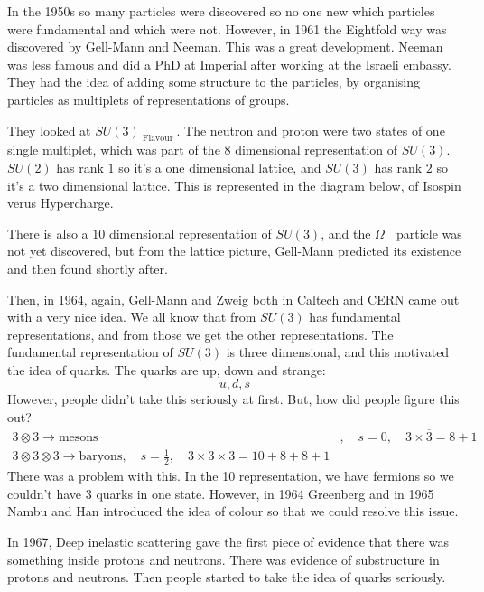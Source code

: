 \documentclass[11pt, oneside]{article}   	%
\theoremstyle{slanted}
\begin{document}
In the 1950s 
so many particles were discovered so no one 
new which particles were fundamental and which 
were not. 
However, in 1961 the Eightfold way 
was discovered by Gell-Mann and Neeman.  
This was a great development. 
Neeman was less famous and did a PhD at 
Imperial after working at the Israeli embassy. 
They had the idea of adding some structure to 
the particles, by organising particles 
as multiplets of representations of 
groups. 

They looked at $ SU ( 3 ) _{ \text{ Flavour } } $. 
The neutron and proton were two states 
of one single multiplet, which 
was part of the 
8 dimensional representation 
of $ SU ( 3 ) $. 
$ SU ( 2 ) $ has rank $ 1  $ 
so it's a one dimensional lattice, 
and $ SU ( 3 ) $ has rank $ 2 $ so it's 
a two dimensional lattice. 
This is represented 
in the diagram below, 
of Isospin verus Hypercharge. 

There is also a $ 10 $ dimensional 
representation of $ SU ( 3 ) $, 
and the $ \Omega^  - $ particle 
was not yet discovered, but 
from the lattice picture, 
Gell-Mann predicted its existence 
and then found shortly after. 


Then, in 1964, again, Gell-Mann and 
Zweig both in Caltech and CERN 
came out with a very nice idea. 
We all know that from $ SU ( 3 ) $
has fundamental representations, 
and from those we get the other 
representations. The fundamental 
representation of $ SU ( 3 ) $ 
is three dimensional, and this motivated 
the idea of quarks. 
The quarks are up, down and strange: 
\[
u , d, s 
\] 
However, people didn't 
take this seriously at first. 
But, how did people figure this out? 
\begin{align*}
3 \otimes 3 \to \text{mesons} & , \quad s = 0, \quad 
3 \times \overline{ 3 }  = 8 + 1 \\
3 \otimes 3 \otimes 3 \to \text{baryons}, \quad 
s = \frac{1}{2 }, \quad 3 \times 3 \times 3  = 
10 + 8 + 8 + 1 
\end{align*}
There was a problem with this. In the 10 representation, 
we have fermions so we couldn't have 
3 quarks in one state. 
However, in 1964 Greenberg and in 1965 Nambu and Han 
introduced the idea of colour so that 
we could resolve this issue. 

In 1967, Deep inelastic 
scattering gave the first piece of 
evidence that there 
was something inside protons and neutrons. 
There was evidence of substructure in protons and neutrons. 
Then people started to take the 
idea of quarks seriously. 
\end{document}
